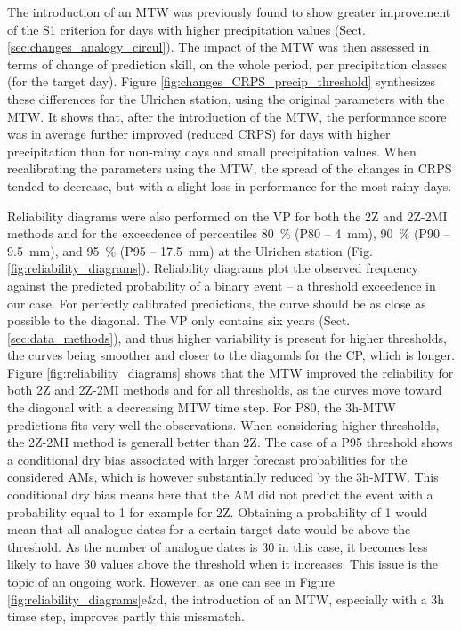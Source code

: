 \documentclass[hess, manuscript]{copernicus}
\begin{document}
	The introduction of an MTW was previously found to show greater improvement of the S1 criterion for days with higher precipitation values (Sect. \ref{sec:changes_analogy_circul}). The impact of the MTW was then assessed in terms of change of prediction skill, on the whole period, per precipitation classes (for the target day). Figure \ref{fig:changes_CRPS_precip_threshold} synthesizes these differences for the Ulrichen station, using the original parameters with the MTW. It shows that, after the introduction of the MTW, the performance score was in average further improved (reduced CRPS) for days with higher precipitation than for non-rainy days and small precipitation values. When recalibrating the parameters using the MTW, the spread of the changes in CRPS tended to decrease, but with a slight loss in performance for the most rainy days.
	
	Reliability diagrams were also performed on the VP for both the 2Z and 2Z-2MI methods and for the exceedence of percentiles 80~\% (P80 -- 4~mm), 90~\% (P90 -- 9.5~mm), and 95~\% (P95 -- 17.5~mm) at the Ulrichen station (Fig. \ref{fig:reliability_diagrams}). Reliability diagrams plot the observed frequency against the predicted probability of a binary event -- a threshold exceedence in our case.	For perfectly calibrated predictions, the curve should be as close as possible to the diagonal. The VP only contains six years (Sect. \ref{sec:data_methods}), and thus higher variability is present for higher thresholds, the curves being smoother and closer to the diagonals for the CP, which is longer. Figure \ref{fig:reliability_diagrams} shows that the MTW improved the reliability for both 2Z and 2Z-2MI methods and for all thresholds, as the curves move toward the diagonal with a decreasing MTW time step. For P80, the 3h-MTW predictions fits very well the observations. When considering higher thresholds, the 2Z-2MI method is generall better than 2Z. The case of a P95 threshold shows a conditional dry bias associated with larger forecast probabilities for the considered AMs, which is however substantially reduced by the 3h-MTW. This conditional dry bias means here that the AM did not predict the event with a probability equal to 1 for example for 2Z. Obtaining a probability of 1 would mean that all analogue dates for a certain target date would be above the threshold. As the number of analogue dates is 30 in this case, it becomes less likely to have 30 values above the threshold when it increases. This issue is the topic of an ongoing work. However, as one can see in Figure \ref{fig:reliability_diagrams}e\&d, the introduction of an MTW, especially with a 3h timse step, improves partly this missmatch.
	
\end{document}
